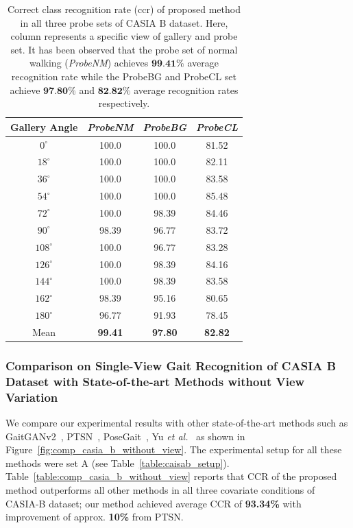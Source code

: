\begin{table}[t]
	\centering
	\caption [Correct class recognition rate (CCR) of proposed method in all three probe sets of CASIA B dataset]
	{Correct class recognition rate (\gls{ccr}) of proposed method in all three probe sets of CASIA B dataset. Here, column represents a specific view of gallery and probe set. It has been observed that the probe set of normal walking (\textit{ProbeNM}) achieves $ \textbf{99.41\%}$ average recognition rate while the ProbeBG and ProbeCL set achieve $ \textbf{97.80\%}$ and $\textbf{82.82\%}$ average recognition rates respectively. \label{table:resutl_without_view}}
	
	{\begin{tabular*}{22pc}{cccc}\hline
	Gallery Angle  &\textit{ProbeNM}  &\textit{ProbeBG} &\textit{ProbeCL} \\\hline\noalign{\smallskip} 
	${0^{\circ}}$	&100.0  &100.0  &81.52  \\\noalign{\smallskip}
	${18^{\circ}}$  &100.0  &100.0  &82.11  \\\noalign{\smallskip}
	${36^{\circ}}$	&100.0  &100.0  &83.58  \\\noalign{\smallskip}
	${54^{\circ}}$	&100.0  &100.0  &85.48  \\\noalign{\smallskip}
	${72^{\circ}}$	&100.0  &98.39 &84.46   \\\noalign{\smallskip}
	${90^{\circ}}$	&98.39  &96.77  &83.72  \\\noalign{\smallskip} 
	${108^{\circ}}$ &100.0  &96.77  &83.28  \\\noalign{\smallskip}
	${126^{\circ}}$ &100.0  &98.39  &84.16  \\\noalign{\smallskip}
	${144^{\circ}}$ &100.0  &98.39  &83.58  \\\noalign{\smallskip}
	${162^{\circ}}$	&98.39  &95.16  &80.65 \\\noalign{\smallskip}
	${180^{\circ}}$ &96.77  &91.93  &78.45  \\\noalign{\smallskip}
	Mean &\textbf{99.41}  &\textbf{97.80}  &\textbf{82.82} \\\hline
	\end{tabular*}}{}
\end{table}



\subsubsection{Comparison on Single-View Gait Recognition of CASIA B Dataset with State-of-the-art Methods without View Variation}
We compare our experimental results with other state-of-the-art methods such as GaitGANv2~\cite{Yu_19}, PTSN~\cite{Liao_17}, PoseGait~\cite{Liao_19}, Yu \textit{et al.}~\cite{Yu_17_spae} as shown in Figure~\ref{fig:comp_casia_b_without_view}. The experimental setup for all these methods were set A (see Table~\ref{table:caisab_setup}). Table~\ref{table:comp_casia_b_without_view} reports that CCR of the proposed method outperforms all other methods in all three covariate conditions of CASIA-B dataset; our method achieved average CCR of \textbf{93.34\%} with improvement of approx. \textbf{10\%} from PTSN.


